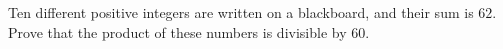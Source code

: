 Ten different positive integers are written on a blackboard, and their sum is $62$. Prove that the product of these numbers is divisible by $60$.
